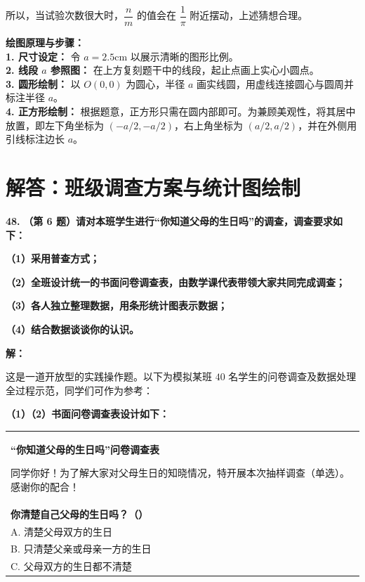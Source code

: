 \documentclass[12pt, a4paper]{ctexrep}
\begin{document}
所以，当试验次数很大时，$\dfrac{n}{m}$ 的值会在 $\dfrac{1}{\pi}$ 附近摆动，上述猜想合理。

\vspace{0.4cm}
{\small\color{blue!70!black}
\textbf{绘图原理与步骤：}\\
\textbf{1. 尺寸设定：} 令 $a = 2.5$cm 以展示清晰的图形比例。\\
\textbf{2. 线段 $a$ 参照图：} 在上方复刻题干中的线段，起止点画上实心小圆点。\\
\textbf{3. 圆形绘制：} 以 $O(0,0)$ 为圆心，半径 $a$ 画实线圆，用虚线连接圆心与圆周并标注半径 $a$。\\
\textbf{4. 正方形绘制：} 根据题意，正方形只需在圆内部即可。为兼顾美观性，将其居中放置，即左下角坐标为 $(-a/2, -a/2)$，右上角坐标为 $(a/2, a/2)$，并在外侧用引线标注边长 $a$。
}

\newpage

\section{解答：班级调查方案与统计图绘制}

\vspace{0.6cm}

\textbf{\LARGE 48.} \textbf{（第 6 题）请对本班学生进行“你知道父母的生日吗”的调查，调查要求如下：}

\textbf{（1）采用普查方式；}

\textbf{（2）全班设计统一的书面问卷调查表，由数学课代表带领大家共同完成调查；}

\textbf{（3）各人独立整理数据，用条形统计图表示数据；}

\textbf{（4）结合数据谈谈你的认识。}

\vspace{0.4cm}
\textbf{解：}

这是一道开放型的实践操作题。以下为模拟某班 $40$ 名学生的问卷调查及数据处理全过程示范，同学们可作为参考：

\vspace{0.3cm}
\textbf{（1）（2）书面问卷调查表设计如下：}

\begin{center}
\renewcommand{\arraystretch}{1.5}
\begin{tabular}{|p{}|}
\hline
\begin{center}\textbf{“你知道父母的生日吗”问卷调查表}\end{center}
同学你好！为了解大家对父母生日的知晓情况，特开展本次抽样调查（单选）。感谢你的配合！\\[0.2cm]
\textbf{你清楚自己父母的生日吗？（\quad）}\\[0.1cm]
A. 清楚父母双方的生日\\
B. 只清楚父亲或母亲一方的生日\\
C. 父母双方的生日都不清楚\\[0.1cm]
\hline
\end{tabular}
\end{center}
\end{document}
